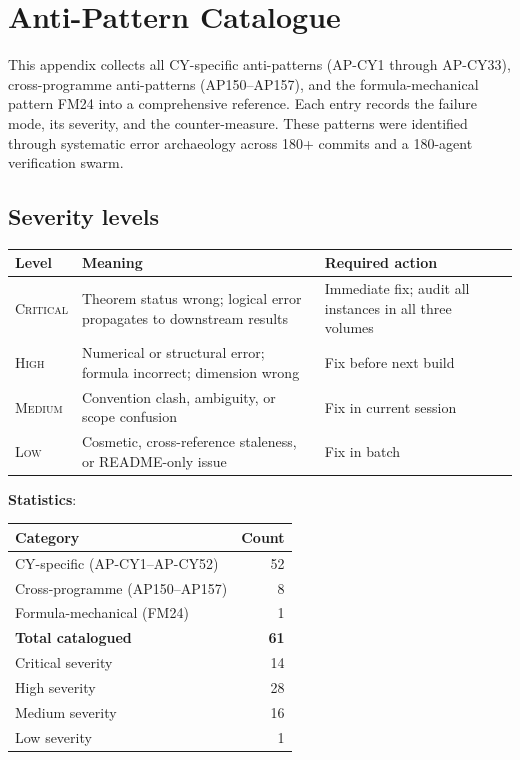 \chapter{Anti-Pattern Catalogue}
\label{app:ap-catalogue}

This appendix collects all CY-specific anti-patterns (AP-CY1 through
AP-CY33), cross-programme anti-patterns (AP150--AP157), and the
formula-mechanical pattern FM24 into a comprehensive reference.
Each entry records the failure mode, its severity, and the
counter-measure.  These patterns were identified through systematic
error archaeology across 180+ commits and a 180-agent verification
swarm.

\section{Severity levels}
\label{sec:ap-sev}

\begin{center}
\begin{tabular}{@{}lp{4.5cm}p{5cm}@{}}
\toprule
\textbf{Level} & \textbf{Meaning} & \textbf{Required action} \\
\midrule
\textsc{Critical} & Theorem status wrong; logical
  error propagates to downstream results &
  Immediate fix; audit all instances in all three volumes \\
\textsc{High} & Numerical or structural error;
  formula incorrect; dimension wrong &
  Fix before next build \\
\textsc{Medium} & Convention clash, ambiguity,
  or scope confusion &
  Fix in current session \\
\textsc{Low} & Cosmetic, cross-reference staleness,
  or README-only issue &
  Fix in batch \\
\bottomrule
\end{tabular}
\end{center}

\noindent
\textbf{Statistics}:
\begin{center}
\begin{tabular}{@{}lr@{}}
\toprule
\textbf{Category} & \textbf{Count} \\
\midrule
CY-specific (AP-CY1--AP-CY52) & 52 \\
Cross-programme (AP150--AP157) & 8 \\
Formula-mechanical (FM24) & 1 \\
\midrule
\textbf{Total catalogued} & \textbf{61} \\
\midrule
Critical severity & 14 \\
High severity & 28 \\
Medium severity & 16 \\
Low severity & 1 \\
\bottomrule
\end{tabular}
\end{center}

